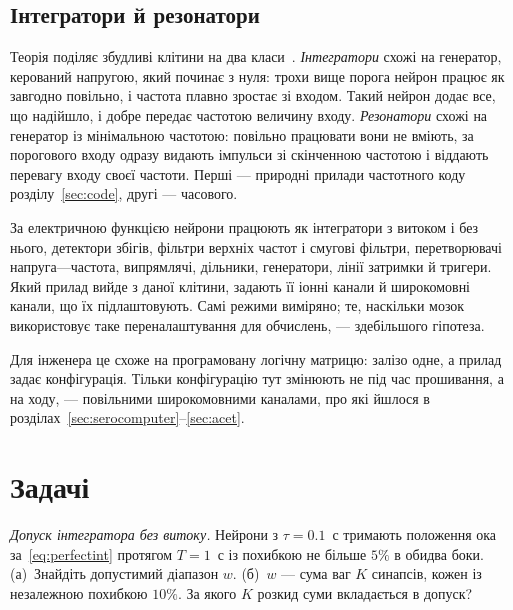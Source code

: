 \subsection{Інтегратори й резонатори}

Теорія поділяє збудливі клітини на два класи~\cite{Izhikevich2007}. \emph{Інтегратори} схожі на генератор, керований напругою, який починає з нуля: трохи вище порога нейрон працює як завгодно повільно, і частота плавно зростає зі входом. Такий нейрон додає все, що надійшло, і добре передає частотою величину входу. \emph{Резонатори} схожі на генератор із мінімальною частотою: повільно працювати вони не вміють, за порогового входу одразу видають імпульси зі скінченною частотою і віддають перевагу входу своєї частоти. Перші --- природні прилади частотного коду розділу~\ref{sec:code}, другі --- часового.

\begin{keyblock}
\begin{proposition}
\label{prop:eetypes}
За електричною функцією нейрони працюють як інтегратори з витоком і без нього, детектори збігів, фільтри верхніх частот і смугові фільтри, перетворювачі напруга---частота, випрямлячі, дільники, генератори, лінії затримки й тригери. Який прилад вийде з даної клітини, задають її іонні канали й широкомовні канали, що їх підлаштовують. Самі режими виміряно; те, наскільки мозок використовує таке переналаштування для обчислень, --- здебільшого гіпотеза.
\end{proposition}
\end{keyblock}

Для інженера це схоже на програмовану логічну матрицю: залізо одне, а прилад задає конфігурація. Тільки конфігурацію тут змінюють не під час прошивання, а на ходу, --- повільними широкомовними каналами, про які йшлося в розділах~\ref{sec:serocomputer}--\ref{sec:acet}.

\section{Задачі}

\begin{exercise}[\lvlA]
\label{ex:18:1}
\emph{Допуск інтегратора без витоку.} Нейрони з $\tau=0.1$~с тримають положення ока за~\eqref{eq:perfectint} протягом $T=1$~с із похибкою не більше $5\%$ в обидва боки. (а)~Знайдіть допустимий діапазон $w$. (б)~$w$ --- сума ваг $K$ синапсів, кожен із незалежною похибкою $10\%$. За якого $K$ розкид суми вкладається в допуск?
\end{exercise}

